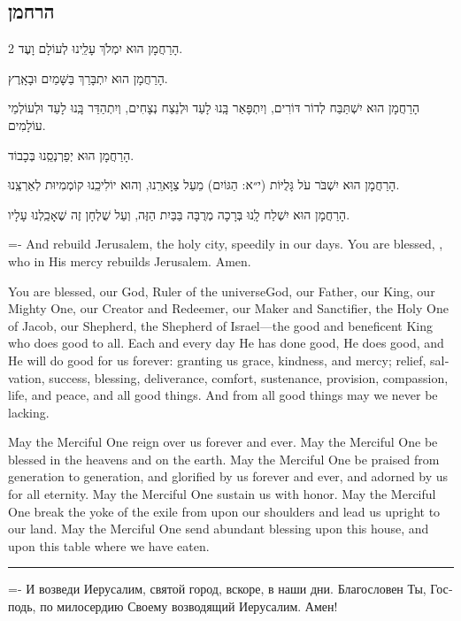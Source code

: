 \documentclass[11pt,twoside]{article}
\makeatletter
\newcommand{\instruction}[1]{%
\ifhmode\else\noindent\fi%
{\plain\tiny{#1}}%
}
\def\fakesc{\@ifnextchar[{\fakesc@opt}{\fakesc@opt[6.5][5.5]}} %
\def\fakesc@opt[#1][#2]{%
  \bgroup
  \def\cap@size{#1}%
  \def\low@size{#2}%
  \obeyspaces
  \helpersc
}
\def\helpersc#1{\helperscii #1\relax\relax\egroup}
\def\helperscii#1{%
  \ifx\relax#1%
  \else
    \ifcat#1\@sptoken
      {}%
      \expandafter\expandafter\expandafter\helperscii
    \else
      \ifnum`#1=\uccode`#1
        {\fontsize{\cap@size}{\cap@size}\selectfont#1}%
      \else
        {\fontsize{\low@size}{\low@size}\selectfont\uppercase{#1}}%
      \fi
      \expandafter\expandafter\expandafter\helperscii
      \expandafter
    \fi
  \fi
}
\newcommand{\ykvk}[2]{\fakesc[#1][#2]{Lord}\xspace}
\makeatother
\begin{document}
\subsection*{הרחמן}
{%
\scriptsize
\begin{multicols}{2}
הָרַחֲמָן הוּא יִמְלֹךְ עָלֵֽינוּ לְעוֹלָם וָעֶד.

הָרַחֲמָן הוּא יִתְבָּרַךְ בַּשָּׁמַיִם וּבָאָֽרֶץ.

הָרַחֲמָן הוּא יִשְׁתַּבַּח לְדוֹר דּוֹרִים, וְיִתְפָּאַר בָּֽנוּ לָעַד וּלְנֵצַח נְצָחִים, וְיִתְהַדַּר בָּֽנוּ לָעַד
וּלְעוֹלְמֵי עוֹלָמִים.

הָרַחֲמָן הוּא יְפַרְנְסֵֽנוּ בְּכָבוֹד.

הָרַחֲמָן הוּא יִשְׁבֹּר עֹל גָּלֻיּוֹת \instruction{(י״א: {\hebrewfont הַגּוֹיִם})} מֵעַל
צַוָּארֵֽנוּ, וְהוּא יוֹלִיכֵֽנוּ קוֹמְמִיוּת לְאַרְצֵֽנוּ.

הָרַחֲמָן הוּא יִשְׁלַח לָֽנוּ בְּרָכָה מְרֻבָּה בַּבַּיִת הַזֶּה, וְעַל שֻׁלְחָן זֶה שֶׁאָכַֽלְנוּ עָלָיו.
\end{multicols}

\newpage

{\fontsize{6}{7.1}%
\begin{english}
\selectfont%
\lineskiplimit=-\maxdimen%
And rebuild Jerusalem, the holy city, speedily in our days.
You are blessed, \ykvk{6}{5.1}{}, who in His mercy rebuilds Jerusalem. Amen.

You are blessed, \ykvk{6}{5.1}{} our God, Ruler of the
universe\textemdash{}God, our
Father, our King, our Mighty One, our Creator and Redeemer, our Maker
and Sanctifier, the Holy One of Jacob, our Shepherd, the Shepherd of
Israel—the good and beneficent King who does good to all. Each and
every day He has done good, He does good, and He will do good for us
forever: granting us grace, kindness, and mercy; relief, salvation,
success, blessing, deliverance, comfort, sustenance, provision,
compassion, life, and peace, and all good things. And from all good
things may we never be lacking.

May the Merciful One reign over us forever and ever. May the Merciful
One be blessed in the heavens and on the earth. May the Merciful One
be praised from generation to generation, and glorified by us forever
and ever, and adorned by us for all eternity. May the Merciful One
sustain us with honor. May the Merciful One break the yoke of the exile
from upon our shoulders and lead us upright to our land. May
the Merciful One send abundant blessing upon this house, and upon this
table where we have eaten.\par
\end{english}
\vfill%
\vspace{\parskip}%
\hrule
\vfill%
\begin{russian}
\selectfont%
\lineskiplimit=-\maxdimen%
И возведи Иерусалим, святой город, вскоре, в наши дни. Благословен Ты,
Господь, по милосердию Своему возводящий Иерусалим. Амен!


\end{russian}}}
\end{document}
